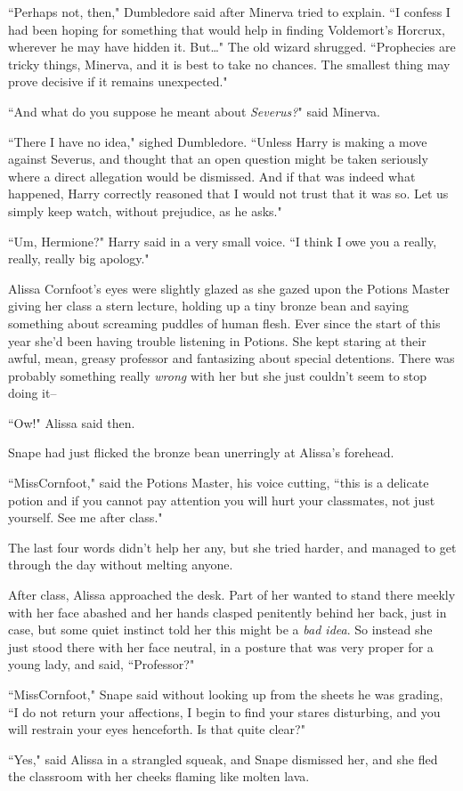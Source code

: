 ``Perhaps not, then," Dumbledore said after Minerva tried to explain. ``I confess I had been hoping for something that would help in finding Voldemort's Horcrux, wherever he may have hidden it. But{\ldots}" The old wizard shrugged. ``Prophecies are tricky things, Minerva, and it is best to take no chances. The smallest thing may prove decisive if it remains unexpected."

``And what do you suppose he meant about \emph{Severus?}" said Minerva.

``There I have no idea," sighed Dumbledore. ``Unless Harry is making a move against Severus, and thought that an open question might be taken seriously where a direct allegation would be dismissed. And if that was indeed what happened, Harry correctly reasoned that I would not trust that it was so. Let us simply keep watch, without prejudice, as he asks."


``Um, Hermione?" Harry said in a very small voice. ``I think I owe you a really, really, really big apology."


Alissa Cornfoot's eyes were slightly glazed as she gazed upon the Potions Master giving her class a stern lecture, holding up a tiny bronze bean and saying something about screaming puddles of human flesh. Ever since the start of this year she'd been having trouble listening in Potions. She kept staring at their awful, mean, greasy professor and fantasizing about special detentions. There was probably something really \emph{wrong} with her but she just couldn't seem to stop doing it\---

``Ow!" Alissa said then.

Snape had just flicked the bronze bean unerringly at Alissa's forehead.

``Miss\?Cornfoot," said the Potions Master, his voice cutting, ``this is a delicate potion and if you cannot pay attention you will hurt your classmates, not just yourself. See me after class."

The last four words didn't help her any, but she tried harder, and managed to get through the day without melting anyone.

After class, Alissa approached the desk. Part of her wanted to stand there meekly with her face abashed and her hands clasped penitently behind her back, just in case, but some quiet instinct told her this might be a \emph{bad idea}. So instead she just stood there with her face neutral, in a posture that was very proper for a young lady, and said, ``Professor?"

``Miss\?Cornfoot," Snape said without looking up from the sheets he was grading, ``I do not return your affections, I begin to find your stares disturbing, and you will restrain your eyes henceforth. Is that quite clear?"

``Yes," said Alissa in a strangled squeak, and Snape dismissed her, and she fled the classroom with her cheeks flaming like molten lava.

